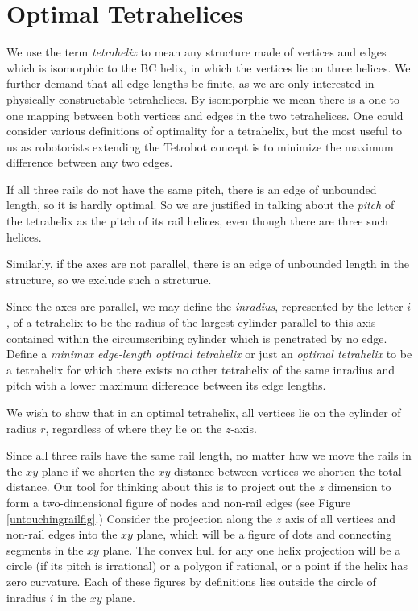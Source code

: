 \documentclass[11pt]{article}
\begin{document}
\section{Optimal Tetrahelices}

We use the term \emph{tetrahelix} to mean any structure made of
vertices and edges which is isomorphic to the BC helix, in which the
vertices lie on three helices. We further demand that all edge lengths
be finite, as we are only interested in physically constructable tetrahelices.
By isomporphic we mean there is a one-to-one mapping between both
vertices and edges in the two tetrahelices.
One could consider various definitions of optimality for a
tetrahelix, but the most useful to us as robotocists extending the Tetrobot concept is to minimize the
maximum difference between any two edges.

If all three rails do not have the same pitch, there is an edge of
unbounded length, so it is hardly optimal. So we are justified in talking about the
\emph{pitch} of 
the tetrahelix as the pitch of its rail helices, even though there are
three such helices.

Similarly, if the axes are not parallel, there is an edge of
unbounded length in the structure, so we exclude such a strcturue.

Since the axes are parallel, we may define the \emph{inradius}, represented by the letter $i$, of a
tetrahelix to be the radius of the largest
cylinder parallel to this axis contained within the circumscribing cylinder
which is penetrated by no edge.
Define a \emph{minimax edge-length optimal tetrahelix} or just an
\emph{optimal tetrahelix} to be a tetrahelix for which there exists
no other tetrahelix of the same inradius and pitch with a lower maximum
difference between its edge lengths. 

We wish to show that in an optimal tetrahelix, all vertices lie on the cylinder
of radius $r$, regardless of where they lie on the $z$-axis.

Since all three rails have the same rail length, no matter how we
move the rails in the $xy$ plane if we shorten the $xy$ distance between
vertices we shorten the total distance.
Our tool for thinking about this is to project out the $z$ dimension to form
a two-dimensional figure of nodes and non-rail edges (see Figure \ref{untouchingrailfig}.)
Consider the projection along the $z$ axis of all vertices and non-rail edges into the $xy$ plane, which will be
a figure of dots and connecting segments in the $xy$ plane. The convex
hull for any one helix projection will be a circle (if its pitch is
irrational) or a polygon if rational, or a point if the helix has
zero curvature. Each of these figures by definitions lies outside the
circle of inradius $i$ in the $xy$ plane.
\end{document}
